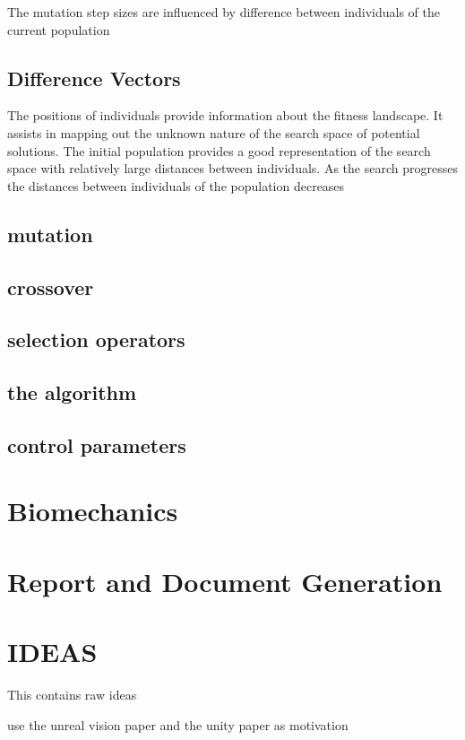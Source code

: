 The mutation step sizes are influenced by difference between individuals of the current population

\subsection{Difference Vectors}

The positions of individuals provide information about the fitness landscape. It assists in mapping out 
the unknown nature of the search space of potential solutions. 
The initial population provides a good representation of the search space with relatively large
distances between individuals. As the search progresses the distances between individuals of the
population decreases

\subsection{mutation}
\subsection{crossover}
\subsection{selection operators }
\subsection{the algorithm}
\subsection{control parameters}




\section{Biomechanics}

\section{Report and Document Generation}    


\section{IDEAS}

This contains raw ideas

use the unreal vision paper and the unity paper as motivation


